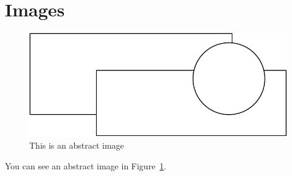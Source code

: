 \section{Images}

\begin{figure}
\centering
\includegraphics[width=0.8\columnwidth]{images/abstract-image}
\caption{This is an abstract image}
\label{fig:abstract-image}
\end{figure}


You can see an abstract image in Figure~\ref{fig:abstract-image}.